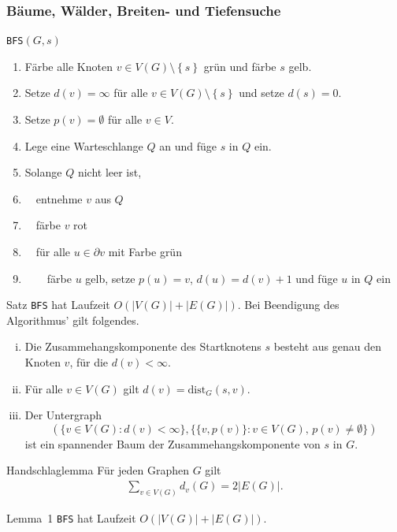 \documentclass[aspectratio=1610, 11pt]{beamer}
\newcommand\dist{\mathrm{dist}}
\newcommand\cbc[1]{\left\{{#1}\right\}}
\newcommand{\mytitle}{B\"aume, W\"alder, Breiten- und Tiefensuche}
\begin{document}
\begin{frame}\frametitle{\mytitle}
	\begin{overprint}
		\begin{exampleblock}{{\tt BFS}$(G,s)$}
			\begin{enumerate}
				\item F\"arbe alle Knoten $v\in V(G)\setminus\cbc s$ gr\"un und f\"arbe $s$ gelb.
				\item Setze $d(v)=\infty$ f\"ur alle $v\in V(G)\setminus\cbc s$ und setze $d(s)=0$.
				\item Setze $p(v)=\emptyset$ f\"ur alle $v\in V$.
				\item Lege eine Warteschlange $Q$ an und f\"uge $s$ in $Q$ ein.
				\item Solange $Q$ nicht leer ist,
				\item $\quad$entnehme $v$ aus $Q$
				\item $\quad$f\"arbe $v$ rot
				\item $\quad$f\"ur alle $u\in\partial v$ mit Farbe gr\"un
				\item $\quad\quad$f\"arbe $u$ gelb, setze $p(u)=v$, $d(u)=d(v)+1$ und f\"uge $u$ in $Q$ ein
			\end{enumerate}		
		\end{exampleblock}
		\begin{block}{Satz}
			{\tt BFS} hat Laufzeit $O(|V(G)|+|E(G)|)$.
			Bei Beendigung des Algorithmus' gilt folgendes.
			\begin{enumerate}[(i)]
				\item Die Zusammehangskomponente des Startknotens $s$ besteht aus genau den Knoten $v$, f\"ur die $d(v)<\infty$.
				\item F\"ur alle $v\in V(G)$ gilt $d(v)=\dist_G(s,v)$.
				\item Der Untergraph $$(\{v\in V(G):d(v)<\infty\},\{\{v,p(v)\}:v\in V(G),\,p(v)\neq\emptyset\})$$ ist ein spannender Baum der Zusammehangskomponente von $s$ in $G$.
			\end{enumerate}
		\end{block}
		\begin{block}{Handschlaglemma}
			F\"ur jeden Graphen $G$ gilt
			\begin{align*}
				\sum_{v\in V(G)}d_v(G)=2|E(G)|.
			\end{align*}
		\end{block}
		\begin{block}{Lemma~1}
			{\tt BFS} hat Laufzeit $O(|V(G)|+|E(G)|)$.

\end{block}
\end{overprint}
\end{frame}
\end{document}
